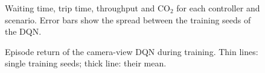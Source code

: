 \begin{figure}[H]
\centering
{}
\caption{Waiting time, trip time, throughput and CO$_2$ for each controller and scenario.
Error bars show the spread between the \camseedsword{} training seeds of the DQN.}
\label{fig:comparison}
\end{figure}

\begin{figure}[H]
\centering
{}
\caption{Episode return of the camera-view DQN during training. Thin lines: single training
seeds; thick line: their mean.}
\label{fig:learning}
\end{figure}

\begin{table}[H]
\centering\small

\caption{Mean waiting time (s) by vehicle class on the unseen days.}
\label{tab:class}
\end{table}



